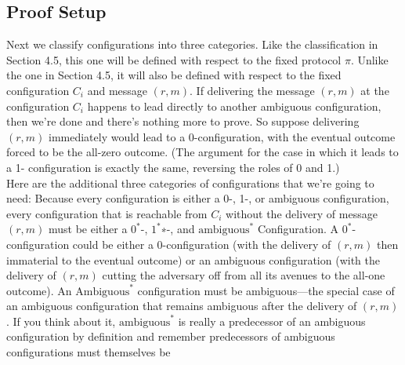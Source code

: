 \subsection{Proof Setup}
Next we classify configurations into three categories. Like the classification in Section 4.5, this
one will be defined with respect to the fixed protocol $\pi$. Unlike the one in Section 4.5, it will
also be defined with respect to the fixed configuration $C_i$ and message $(r, m)$.
If delivering the message $(r, m)$ at the configuration $C_i$ happens to lead directly to another
ambiguous configuration, then we’re done and there’s nothing more to prove. So suppose
delivering $(r, m)$ immediately would lead to a 0-configuration, with the eventual outcome
forced to be the all-zero outcome. (The argument for the case in which it leads to a 1-
configuration is exactly the same, reversing the roles of 0 and 1.)\\
Here are the additional three categories of configurations that we’re going to need:
Because every configuration is either a 0-, 1-, or ambiguous configuration, every configuration
that is reachable from $C_i$ without the delivery of message $(r, m)$ must be either a $0^*$-, $1^*$∗-, and $\text{ambiguous}^*$ Configuration. A $0^*$-configuration could be either a 0-configuration (with the delivery of $(r, m)$ then immaterial to the eventual outcome) or an ambiguous configuration
(with the delivery of $(r, m)$ cutting the adversary off from all its avenues to the all-one outcome). An $\text{Ambiguous}^*$ configuration must be ambiguous—the special case of an ambiguous configuration that remains ambiguous after the delivery of $(r, m)$. If you think about it, $\text{ambiguous}^*$ is really a predecessor of
an ambiguous configuration by definition
and remember predecessors of ambiguous
configurations must themselves be
